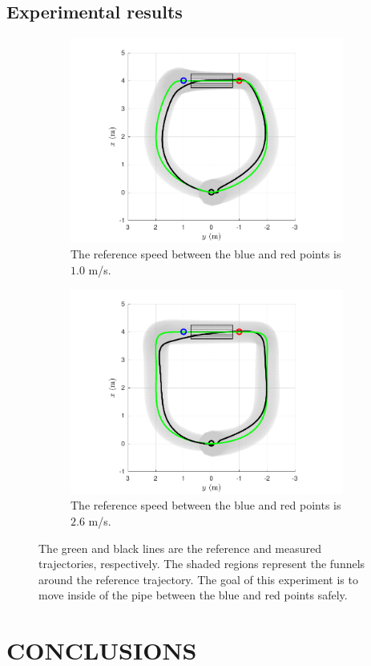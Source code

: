 \documentclass[letterpaper, 10 pt, conference]{ieeeconf}  %
\begin{document}
\subsection{Experimental results}
\begin{figure}[!h]
\begin{subfigure}[b]{0.5\textwidth}
\centering
\includegraphics[width=9.0cm]{slow.pdf}
\caption{The reference speed between the blue and red points is $1.0$ m/s.}
\end{subfigure}
\begin{subfigure}[b]{0.5\textwidth}
\centering
\includegraphics[width=9.0cm]{fast.pdf}
\caption{The reference speed between the blue and red points is $2.6$ m/s.}
\end{subfigure}
\caption{The green and black lines are the reference and measured trajectories, respectively. The shaded regions represent the funnels around the reference trajectory. The goal of this experiment is to move inside of the pipe between the blue and red points safely.}
\label{fig:experimentalResult}
\end{figure}

\section{CONCLUSIONS}
\end{document}
